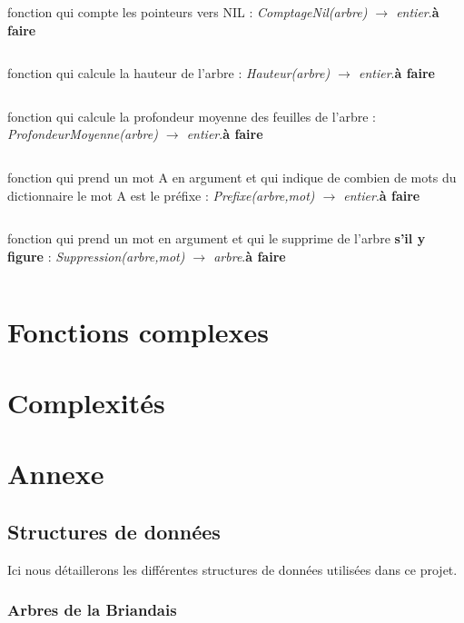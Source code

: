 \documentclass[a4paper,8pt]{report}
\begin{document}
fonction qui compte les pointeurs vers NIL : \textit{ComptageNil(arbre) $\rightarrow$ entier}.\textbf{\`a faire}
\begin{verbatim}
\end{verbatim}

fonction qui calcule la hauteur de l'arbre : \textit{Hauteur(arbre) $\rightarrow$ entier}.\textbf{\`a faire}
\begin{verbatim}
\end{verbatim}

fonction qui calcule la profondeur moyenne des feuilles de l'arbre : \textit{ProfondeurMoyenne(arbre) $\rightarrow$ entier}.\textbf{\`a faire}
\begin{verbatim}
\end{verbatim}

fonction qui prend un mot A en argument et qui indique de combien de mots du dictionnaire le mot A est le pr\'efixe : \textit{Prefixe(arbre,mot) $\rightarrow$ entier}.\textbf{\`a faire}
\begin{verbatim}
\end{verbatim}

fonction qui prend un mot en argument et qui le supprime de l'arbre \textbf{s'il y figure} : \textit{Suppression(arbre,mot) $\rightarrow$ arbre}.\textbf{\`a faire}
\begin{verbatim}
\end{verbatim}

\chapter{Fonctions complexes}

\chapter{Complexit\'es}

\chapter{Annexe}
\section*{Structures de donn\'ees}\label{sec:name}

Ici nous d\'etaillerons les diff\'erentes structures de donn\'ees utilis\'ees dans ce projet.

\subsection*{Arbres de la Briandais}\label{sec:name}
\end{document}
